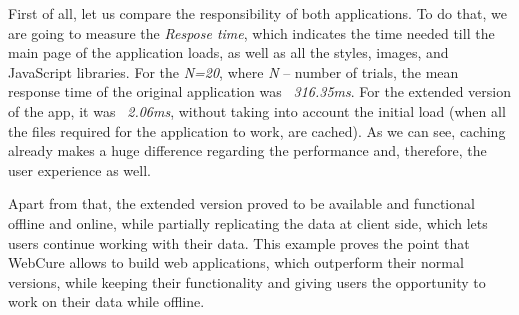 First of all, let us compare the responsibility of both applications. To do that, we are going to measure the \textit{Respose time}, which indicates the time needed till the main page of the application loads, as well as all the styles, images, and JavaScript libraries. For the \textit{N=20}, where \textit{N} -- number of trials, the mean response time of the original application was \textit{~316.35ms}. For the extended version of the app, it was \textit{~2.06ms}, without taking into account the initial load (when all the files required for the application to work, are cached). As we can see, caching already makes a huge difference regarding the performance and, therefore, the user experience as well. 

Apart from that, the extended version proved to be available and functional offline and online, while partially replicating the data at client side, which lets users continue working with their data. This example proves the point that WebCure allows to build web applications, which outperform their normal versions, while keeping their functionality and giving users the opportunity to work on their data while offline.

